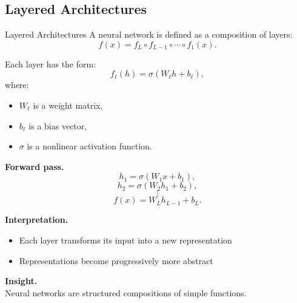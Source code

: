 \documentclass[aspectratio=169,11pt]{beamer}
\begin{document}
\subsection{Layered Architectures}
\begin{frame}[t,allowframebreaks]{Layered Architectures}
\small
A neural network is defined as a composition of layers:
\[
f(x) = f_L \circ f_{L-1} \circ \cdots \circ f_1(x).
\]

Each layer has the form:
\[
f_\ell(h) = \sigma(W_\ell h + b_\ell),
\]
where:
\begin{itemize}
    \item $W_\ell$ is a weight matrix,
    \item $b_\ell$ is a bias vector,
    \item $\sigma$ is a nonlinear activation function.
\end{itemize}

\textbf{Forward pass.}\\ \[
h_1 = \sigma(W_1 x + b_1),
\]
\[
h_2 = \sigma(W_2 h_1 + b_2),
\]
\[
\vdots
\]
\[
f(x) = W_L h_{L-1} + b_L.
\]

\textbf{Interpretation.}\\ \begin{itemize}
    \item Each layer transforms its input into a new representation
    \item Representations become progressively more abstract
\end{itemize}

\textbf{Insight.}\\ Neural networks are structured compositions of simple functions.
\end{frame}
\end{document}

